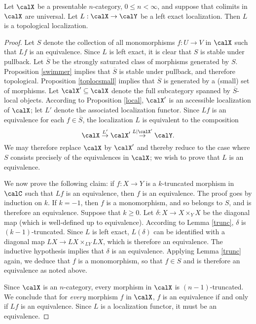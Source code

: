 \begin{proposition}\label{alltoploc}
Let $\calX$ be a presentable $n$-category, $0 \leq n < \infty$, and suppose that colimits in $\calX$ are universal. Let $L: \calX \rightarrow \calY$ be a left exact localization. Then $L$ is a topological localization.
\end{proposition}

\begin{proof}
Let $S$ denote the collection of all monomorphisms $f: U \rightarrow V$ in $\calX$ such that $Lf$ is an equivalence. Since $L$ is left exact, it is clear that $S$ is stable under pullback. Let $\overline{S}$ be the strongly saturated class of morphisms generated by $S$. Proposition \ref{swimmer} implies that $\overline{S}$ is stable under pullback, and therefore topological.
Proposition \ref{toplocsmall} implies that $\overline{S}$ is generated by a (small) set of morphisms. 
Let $\calX' \subseteq \calX$ denote the full subcategory spanned by $\overline{S}$-local objects. According to Proposition \ref{local}, $\calX'$ is an accessible localization of $\calX$; let $L'$ denote the associated localization functor. Since $Lf$ is an equivalence for each $f \in \overline{S}$, the localization $L$ is equivalent to the composition
$$ \calX \stackrel{L'}{\rightarrow} \calX' \stackrel{L|\calX'}{\rightarrow} \calY.$$
We may therefore replace $\calX$ by $\calX'$ and thereby reduce to the case where
$S$ consists precisely of the equivalences in $\calX$; we wish to prove that $L$ is an equivalence.

We now prove the following claim: if $f: X \rightarrow Y$ is a $k$-truncated morphism in $\calC$
such that $Lf$ is an equivalence, then $f$ is an equivalence. The proof goes by induction on 
$k$. If $k = -1$, then $f$ is a monomorphism, and so belongs to $S$, and is therefore an equivalence. Suppose that $k \geq 0$. Let
$\delta: X \rightarrow X \times_{Y} X$ be the diagonal map (which is well-defined up to equivalence). According to Lemma \ref{trunc}, $\delta$ is $(k-1)$-truncated. Since
$L$ is left exact, $L(\delta)$ can be identified with a diagonal map $LX \rightarrow LX \times_{LY} LX$, which is therefore an equivalence. The inductive hypothesis implies that $\delta$ is an equivalence. Applying Lemma \ref{trunc} again, we deduce that $f$ is a monomorphism, so that $f \in S$ and is therefore an equivalence as noted above. 

Since $\calX$ is an $n$-category, every morphism in $\calX$ is $(n-1)$-truncated. We conclude that for {\em every} morphism $f $ in $\calX$, $f$ is an equivalence if and only if $Lf$ is an equivalence. Since $L$ is a localization functor, it must be an equivalence.
\end{proof}

